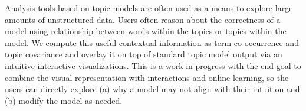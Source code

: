 Analysis tools based on topic models are often used as a means to explore large amounts of unstructured data. Users often reason about the correctness of a model using relationship between words within the topics or topics within the model. We compute this useful contextual information as term co-occurrence and topic covariance and overlay it on top of standard topic model output via an intuitive interactive visualizations. This is a work in progress with the end goal to combine the visual representation with interactions and online learning, so the users can directly explore (a) why a model may not align with their intuition and (b) modify the model as needed.

